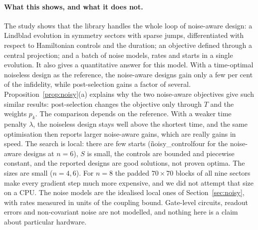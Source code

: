 \paragraph{What this shows, and what it does not.} The study shows that the library handles the whole loop of
noise-aware design: a Lindblad evolution in symmetry sectors with sparse jumps, differentiated with respect to
Hamiltonian controls and the duration; an objective defined through a central projection; and a batch of noise models,
rates and starts in a single evolution. It also gives a quantitative answer for this model. With a time-optimal
noiseless design as the reference, the noise-aware designs gain only a few per cent of the infidelity, while
post-selection gains a factor of several. Proposition~\ref{prop:noisy}(a) explains why the two noise-aware objectives
give such similar results: post-selection changes the objective only through $T$ and the weights $p_k$. The comparison
depends on the reference. With a weaker time penalty $\lambda$, the noiseless design stays well above the shortest
time, and the same optimisation then reports larger noise-aware gains, which are really gains in speed. The search is
local: there are few starts (\G{noisy_control}{\NCWarmLarge}{four} for the noise-aware designs at $n=6$), $S$ is
small, the controls are bounded and piecewise constant, and the reported designs are good solutions, not proven optima.
The sizes are small ($n=4,6$). For $n=8$ the padded $70\times70$ blocks of all nine sectors make every gradient step
much more expensive, and we did not attempt that size on a CPU. The noise models are the idealised local ones of
Section~\ref{sec:noisy}, with rates measured in units of the coupling bound. Gate-level circuits, readout errors and
non-covariant noise are not modelled, and nothing here is a claim about particular hardware.
